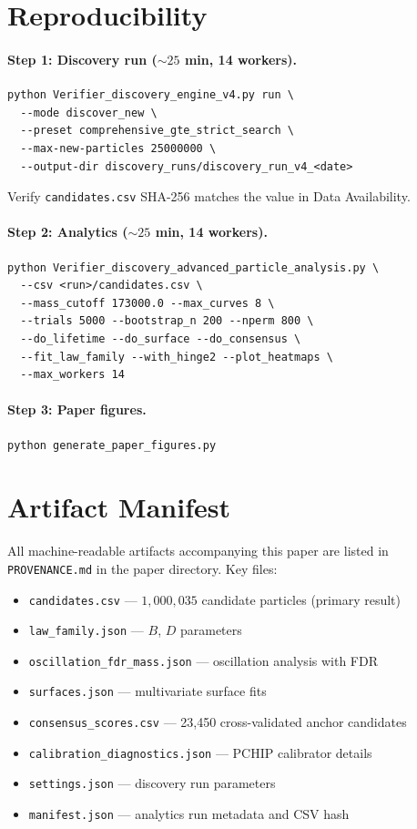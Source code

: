 \documentclass[12pt]{article}
\numberwithin{equation}{section}
\begin{document}
\section{Reproducibility}
\label{app:reproduce}

\paragraph{Step 1: Discovery run (${\sim}25$ min, 14 workers).}
{\small\begin{verbatim}
python Verifier_discovery_engine_v4.py run \
  --mode discover_new \
  --preset comprehensive_gte_strict_search \
  --max-new-particles 25000000 \
  --output-dir discovery_runs/discovery_run_v4_<date>
\end{verbatim}}
Verify \texttt{candidates.csv} SHA-256 matches the value in Data Availability.

\paragraph{Step 2: Analytics (${\sim}25$ min, 14 workers).}
{\small\begin{verbatim}
python Verifier_discovery_advanced_particle_analysis.py \
  --csv <run>/candidates.csv \
  --mass_cutoff 173000.0 --max_curves 8 \
  --trials 5000 --bootstrap_n 200 --nperm 800 \
  --do_lifetime --do_surface --do_consensus \
  --fit_law_family --with_hinge2 --plot_heatmaps \
  --max_workers 14
\end{verbatim}}

\paragraph{Step 3: Paper figures.}
\begin{verbatim}
python generate_paper_figures.py
\end{verbatim}

\section{Artifact Manifest}
\label{app:artifacts}

All machine-readable artifacts accompanying this paper are listed in \texttt{PROVENANCE.md} in the paper directory. Key files:

\begin{itemize}[nosep]
\item \texttt{candidates.csv} --- $1{,}000{,}035$ candidate particles (primary result)
\item \texttt{law\_family.json} --- $B$, $D$ parameters
\item \texttt{oscillation\_fdr\_mass.json} --- oscillation analysis with FDR
\item \texttt{surfaces.json} --- multivariate surface fits
\item \texttt{consensus\_scores.csv} --- 23,450 cross-validated anchor candidates
\item \texttt{calibration\_diagnostics.json} --- PCHIP calibrator details
\item \texttt{settings.json} --- discovery run parameters
\item \texttt{manifest.json} --- analytics run metadata and CSV hash
\end{itemize}
\end{document}
